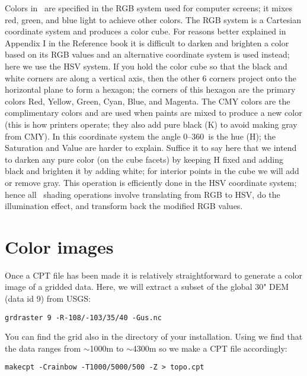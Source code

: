 \documentclass{report}
\begin{document}
Colors in \GMT\ are specified in the RGB system used for computer
screens; it mixes red, green, and blue light to achieve other colors.
The RGB system is a Cartesian coordinate system and produces a color cube.
For reasons better explained in Appendix I in the Reference book it is
difficult to darken and brighten a color based on its RGB values and an
alternative coordinate system is used instead; here we use the HSV system.
If you hold the color cube so that the black and white corners are along
a vertical axis, then the other 6 corners project onto the horizontal plane to
form a hexagon; the corners of this hexagon are the primary colors Red,
Yellow, Green, Cyan, Blue, and Magenta.
The CMY colors are the complimentary colors and are used when paints are
mixed to produce a new color (this is how printers operate; they also add
pure black (K) to avoid making gray from CMY).  In this coordinate system the
angle 0--360\DS\ is the hue (H); the Saturation and Value are harder to
explain.  Suffice it to say here that we intend to darken any pure color
(on the cube facets) by keeping H fixed and adding black and brighten it by adding white; for
interior points in the cube we will add or remove gray.
This operation is efficiently done in the HSV coordinate system; hence all
\GMT\ shading operations involve translating from RGB to HSV, do the
illumination effect, and transform back the modified RGB values.

\section{Color images}

Once a CPT file has been made it is relatively straightforward to generate
a color image of a gridded data.  Here, we will extract a subset of the
global 30" DEM (data id 9) from USGS:

{\small\begin{verbatim}
grdraster 9 -R-108/-103/35/40 -Gus.nc
\end{verbatim}
}

You can find the grid  also in the  directory
of your \GMT{} installation.
Using  we find that the data ranges from $\sim$1000m to
\noindent
$\sim$4300m so we make a CPT file accordingly:

{\small\begin{verbatim}
makecpt -Crainbow -T1000/5000/500 -Z > topo.cpt
\end{verbatim}
}
\end{document}
